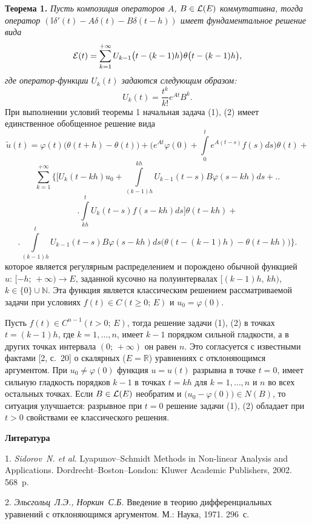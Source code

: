 \textbf{Теорема 1.} {\it Пусть композиция операторов $A$, $B\in{\cal L}(E)$ коммутативна, тогда оператор $\left({\mathbb I}\delta'(t)-A\delta(t)-B\delta(t-h)\right)$ имеет фундаментальное решение вида
$$
{\cal E}(t)=\sum\limits_{k=1}^{+\infty}U_{k-1}\bigl(t-(k-1)h\bigr)\theta\bigl(t-(k-1)h\bigr),
$$
где оператор-функции $U_{k}(t)$ задаются следующим образом:
$$
U_{k}(t)=\frac{t^{k}}{k!}e^{At}B^{k}.
$$}
При выполнении условий теоремы 1 начальная задача (1), (2) имеет единственное обобщенное решение вида
$$
\tilde{u}(t)=\varphi(t)\bigl(\theta(t+h)-\theta(t)\bigr)+\bigl(e^{At}\varphi(0)+\int\limits_{0}^{t}e^{A(t-s)}f(s)ds\bigr)\theta(t)+
$$
$$
\sum\limits_{k=1}^{+\infty}\biggl\lbrace\biggl[ U_{k}(t-kh)u_{0}+\int\limits_{(k-1)h}^{kh}U_{k-1}(t-s)B\varphi(s-kh)ds+\biggr.\biggr.
$$
$$
\biggl.\int\limits_{kh}^{t}U_{k}(t-s)f(s-kh)ds\biggr]\theta(t-kh)+
$$
$$
\biggl.\int\limits_{(k-1)h}^{t}U_{k-1}(t-s)B\varphi(s-kh)ds\bigl(\theta(t-(k-1)h)-\theta(t-kh)\bigr)\biggr\rbrace.
$$
которое является регулярным распределением и порождено обычной функцией $u:\,[-h;\,+\infty)\to E$, заданной кусочно на полуинтервалах $[(k-1)h,\,kh)$, $k\in\lbrace0\rbrace\cup{\mathbb N}$. Эта функция является классическим решением рассматриваемой задачи при условиях $f(t)\in C(t\geqslant0;\,E)$ и $u_{0}=\varphi(0)$.

Пусть $f(t)\in C^{n-1}(t>0;\,E)$, тогда решение задачи (1), (2) в точках $t=(k-1)h$, где $k=1,\ldots,n$, имеет $k-1$ порядком сильной гладкости, а в других точках интервала $(0;\,+\infty)$ он равен $n$. Это согласуется с известными фактами  [2, с.~20] о скалярных ($E={\mathbb R}$) уравнениях с отклоняющимся аргументом. При $u_{0}\neq\varphi(0)$ функция $u=u(t)$ разрывна в точке $t=0$, имеет сильную гладкость порядков $k-1$ в точках $t=kh$ для $k=1,\ldots,n$ и $n$ во всех остальных точках. Если $B\in{\cal L}(E)$ необратим и $\bigl(u_{0}-\varphi(0)\bigr)\in N(B)$, то ситуация улучшается: разрывное при $t=0$ решение задачи (1), (2) обладает при $t>0$  свойствами ее классического решения.

\smallskip \centerline{\bf Литература}\nopagebreak

1. {\it Sidorov~N. et al.} Lyapunov--Schmidt Methods in Non-linear Analysis and Applications. Dordrecht--Boston--London: Kluwer Academic Publishers, 2002. 568~p.

2. {\it Эльсгольц~Л.Э., Норкин~С.Б.} Введение в теорию дифференциальных уравнений с отклоняющимся аргументом. М.: Наука, 1971. 296~с.
